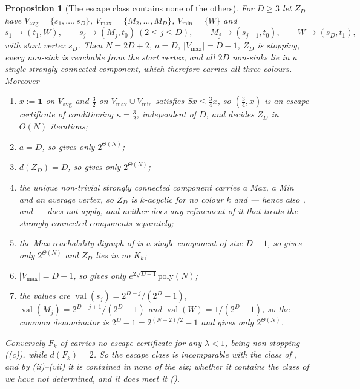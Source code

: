 \documentclass[11pt]{article}
\theoremstyle{plain}
\newtheorem{proposition}[theorem]{Proposition}
\theoremstyle{definition}
\DeclareMathOperator{\val}{val}
\newcommand{\Vmax}{V_{\max}}
\newcommand{\Vmin}{V_{\min}}
\newcommand{\Vavg}{V_{\mathrm{avg}}}
\newcommand{\bbone}{\mathbf{1}}
\begin{document}
\begin{proposition}[The escape class contains none of the
others]\label{prop:escape-family}
For $D\ge3$ let $Z_D$ have $\Vavg=\{s_1,\dots,s_D\}$,
$\Vmax=\{M_2,\dots,M_D\}$, $\Vmin=\{W\}$ and
\[
  s_1\to(t_1,W),\qquad s_j\to(M_j,t_0)\ (2\le j\le D),\qquad
  M_j\to(s_{j-1},t_0),\qquad W\to(s_D,t_1),
\]
with start vertex $s_D$. Then $N=2D+2$, $a=D$, $|\Vmax|=D-1$, $Z_D$ is
stopping, every non-sink is reachable from the start vertex, and all
$2D$ non-sinks lie in a single strongly connected component, which
therefore carries all three colours. Moreover
\begin{enumerate}[label=(\roman*),leftmargin=2.2em]
\item $x:=\bbone$ on $\Vavg$ and $\tfrac32$ on $\Vmax\cup\Vmin$ satisfies
      $Sx\le\tfrac34x$, so $(\tfrac34,x)$ is an escape certificate of
      conditioning $\kappa=\tfrac32$, independent of $D$, and
       decides $Z_D$ in $O(N)$ iterations;
\item $a=D$, so  gives only $2^{\Theta(N)}$;
\item $d(Z_D)=D$, so  gives only $2^{\Theta(N)}$;
\item the unique non-trivial strongly connected component carries a Max,
      a Min and an average vertex, so $Z_D$ is $k$-acyclic for no colour
      $k$ and  --- hence also ,
       and  --- does not
      apply, and neither does any refinement of it that treats the
      strongly connected components separately;
\item the Max-reachability digraph of  is a single
      component of size $D-1$, so  gives
      only $2^{\Theta(N)}$ and $Z_D$ lies in no $K_k$;
\item $|\Vmax|=D-1$, so  gives only
      $e^{2\sqrt{D-1}}\mathrm{poly}(N)$;
\item the values are $\val(s_j)=2^{D-j}/(2^{D}-1)$,
      $\val(M_j)=2^{D-j+1}/(2^{D}-1)$ and $\val(W)=1/(2^{D}-1)$, so the
      common denominator is $2^{D}-1=2^{(N-2)/2}-1$ and
       gives only $2^{\Theta(N)}$.
\end{enumerate}
Conversely $F_k$ of  carries no escape certificate
for any $\lambda<1$, being non-stopping ((c)), while
$d(F_k)=2$. So the escape class is incomparable with the class of
, and by (ii)--(vii) it is contained in none of the
six; whether it contains the class of  we have not
determined, and it does meet it ().


\end{proposition}
\end{document}
